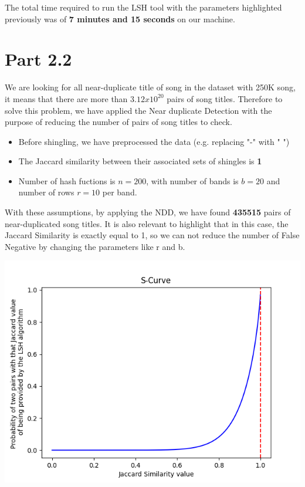 \documentclass[10pt]{article}
\begin{document}
The total time required to run the LSH tool with the parameters highlighted previously was of \textbf{7 minutes and 15 seconds} on our machine.

\section{Part 2.2}

We are looking for all near-duplicate title of song in the dataset with 250K song, it means that there are more than $3.12x10^{20}$ pairs of song titles. Therefore to solve this problem, we have applied the Near duplicate Detection with the purpose of reducing the number of pairs of song titles to check.

\begin{itemize}
\item Before shingling, we have preprocessed the data (e.g. replacing "-" with " ")
\item The Jaccard similarity between their associated sets of shingles is \textbf{1}
\item Number of hash fuctions is \textbf{$n = 200$}, with number of bands is \textbf{$b = 20$} and number of rows \textbf{$r = 10$} per band. 
\end{itemize}

With these assumptions, by applying the NDD, we have found \textbf{435515} pairs of near-duplicated song titles. It is also relevant to highlight that in this case, the Jaccard Similarity is exactly equal to 1, so we can not reduce the number of False Negative by changing the parameters like r and b.

\begin{center}
\includegraphics[scale=.70]{SCurve22.png}
\end{center}
\end{document}
